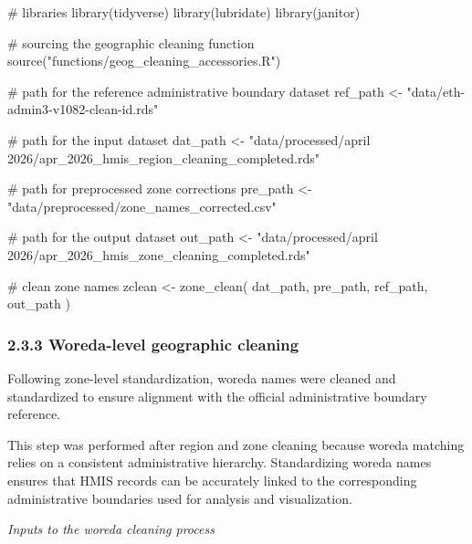 \documentclass[
  letterpaper,
  DIV=11,
  numbers=noendperiod]{scrartcl}
\newenvironment{Shaded}{\begin{snugshade}}{\end{snugshade}}
\newcommand{\CommentTok}[1]{\textcolor[rgb]{0.37,0.37,0.37}{#1}}
\newcommand{\FunctionTok}[1]{\textcolor[rgb]{0.28,0.35,0.67}{#1}}
\newcommand{\NormalTok}[1]{\textcolor[rgb]{0.00,0.23,0.31}{#1}}
\newcommand{\OtherTok}[1]{\textcolor[rgb]{0.00,0.23,0.31}{#1}}
\newcommand{\StringTok}[1]{\textcolor[rgb]{0.13,0.47,0.30}{#1}}
\begin{document}
\begin{Shaded}
\begin{Highlighting}[]
\CommentTok{\# libraries}
\FunctionTok{library}\NormalTok{(tidyverse)}
\FunctionTok{library}\NormalTok{(lubridate)}
\FunctionTok{library}\NormalTok{(janitor)}

\CommentTok{\# sourcing the geographic cleaning function}
\FunctionTok{source}\NormalTok{(}\StringTok{"functions/geog\_cleaning\_accessories.R"}\NormalTok{)}

\CommentTok{\# path for the reference administrative boundary dataset}
\NormalTok{ref\_path }\OtherTok{\textless{}{-}} \StringTok{"data/eth{-}admin3{-}v1082{-}clean{-}id.rds"}

\CommentTok{\# path for the input dataset}
\NormalTok{dat\_path }\OtherTok{\textless{}{-}} \StringTok{"data/processed/april 2026/apr\_2026\_hmis\_region\_cleaning\_completed.rds"}

\CommentTok{\# path for preprocessed zone corrections}
\NormalTok{pre\_path }\OtherTok{\textless{}{-}} \StringTok{"data/preprocessed/zone\_names\_corrected.csv"}

\CommentTok{\# path for the output dataset}
\NormalTok{out\_path }\OtherTok{\textless{}{-}} \StringTok{"data/processed/april 2026/apr\_2026\_hmis\_zone\_cleaning\_completed.rds"}

\CommentTok{\# clean zone names}
\NormalTok{zclean }\OtherTok{\textless{}{-}} \FunctionTok{zone\_clean}\NormalTok{(}
\NormalTok{  dat\_path,}
\NormalTok{  pre\_path,}
\NormalTok{  ref\_path,}
\NormalTok{  out\_path}
\NormalTok{)}
\end{Highlighting}
\end{Shaded}

\subsubsection{2.3.3 Woreda-level geographic
cleaning}\label{woreda-level-geographic-cleaning}

Following zone-level standardization, woreda names were cleaned and
standardized to ensure alignment with the official administrative
boundary reference.

This step was performed after region and zone cleaning because woreda
matching relies on a consistent administrative hierarchy. Standardizing
woreda names ensures that HMIS records can be accurately linked to the
corresponding administrative boundaries used for analysis and
visualization.

\emph{Inputs to the woreda cleaning process}
\end{document}
